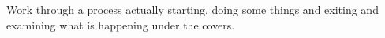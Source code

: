 Work through a process actually starting, doing some things and exiting and
examining what is happening under the covers.\\
